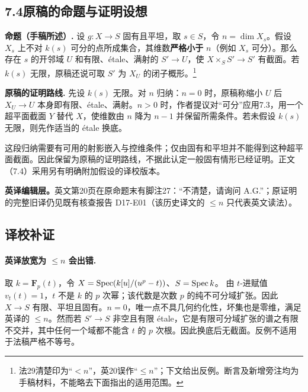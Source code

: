 \endgroup


\hypertarget{D18-099-notes}{}
\begingroup
\def\OO{\mathcal O}\def\FF{\mathcal F}\def\GG{\mathcal G}
\def\PP{\mathbf P}\def\calP{\mathcal P}\def\dd{\delta}
\def\Div{\operatorname{Div}}\def\depth{\operatorname{depth}}
\def\pr{\operatorname{pr}}\def\coker{\operatorname{coker}}
\subsection*{7.4\quad 原稿的命题与证明设想}
\textbf{命题（手稿所述）.}
设 $g:X\to S$ 固有且平坦，取 $s\in S$，令 $n=\dim X_s$。假设 $X_s$ 上不对 $k(s)$ 可分的点所成集合，其维数\textbf{严格小于} $n$（例如 $X_s$ 可分）。那么存在 $s$ 的开邻域 $U$ 和有限、étale、满射的 $S'\to U$，使 $X\times_S S'\to S'$ 有截面。若 $k(s)$ 无限，原稿还说可取 $S'$ 为 $X_U$ 的闭子概形。\footnote{法29清楚印为“$<n$”，英20误作“$\le n$”；下文给出反例。断言及新增旁注均为手稿材料，不能略去下面指出的适用范围。}

\textbf{原稿的证明路线.}
先设 $k(s)$ 无限。对 $n$ 归纳：$n=0$ 时，原稿称缩小 $U$ 后 $X_U\to U$ 本身即有限、étale、满射。$n>0$ 时，作者提议对“可分”应用7.3，用一个超平面截面 $Y$ 替代 $X$，使维数由 $n$ 降为 $n-1$ 并保留所需条件。若未假设 $k(s)$ 无限，则先作适当的 étale 换底。

这段归纳需要有可用的射影嵌入与控维条件；仅由固有和平坦并不能得到这种超平面截面。因此保留为原稿的证明路线，不据此认定一般固有情形已经证明。正文（7.4）采用另有明确附加假设的译校版本。

\par\noindent\textbf{英译编辑层。}英文第20页在原命题末有脚注27：“不清楚，请询问 A.G.”；原证明的完整旧译仍见既有核查报告 D17-E01（该历史译文的 $\le n$ 只代表英文读法）。
\subsection*{译校补证}
\paragraph{英译放宽为 $\le n$ 会出错.}
取 $k=\mathbf F_p(t)$，令 $X=\operatorname{Spec}(k[u]/(u^p-t))$、$S=\operatorname{Spec} k$。
由 $t$-进赋值 $v_t(t)=1$，$t$ 不是 $k$ 的 $p$ 次幂；该代数是次数 $p$ 的纯不可分域扩张。因此 $X\to S$ 有限、平坦且固有。$n=0$，唯一点不具几何约化性，坏集也是零维，满足英译的 $\le n$。然而若 $S'\to S$ 非空且有限 étale，它是有限可分域扩张的谱之有限不交并，其中任何一个域都不能含 $t$ 的 $p$ 次根。因此换底后无截面。反例不适用于法稿严格不等号。

